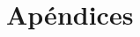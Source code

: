 \documentclass[letterpaper,12pt]{article}
\begin{document}
\begin{thebibliography}{}
%
%
%
%




\end{thebibliography}

\newpage
\appendix
\section{Apéndices}
\end{document}
